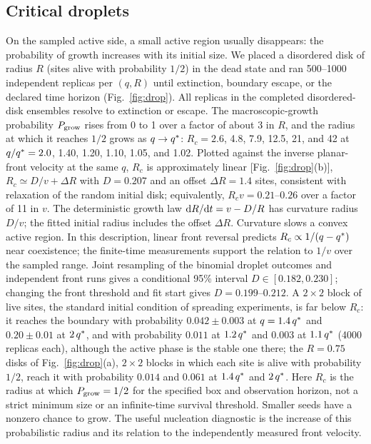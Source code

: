 \subsection{Critical droplets}
\label{sec:drops}

On the sampled active side, a small active region usually disappears:
the probability of growth increases with its initial size. We placed a disordered disk of radius $R$
(sites alive with probability $1/2$) in the dead state and ran 500--1000 independent replicas per
$(q,R)$ until extinction, boundary escape, or the declared time horizon
(Fig.~\ref{fig:drop}). All replicas in the completed disordered-disk ensembles resolve
to extinction or escape. The macroscopic-growth probability $P_{\rm grow}$
rises from 0 to 1 over a factor of about 3 in $R$, and the radius at which it reaches
$1/2$ grows as $q\to q^{*}$: $R_c = 2.6$, 4.8, 7.9, 12.5, 21, and 42 at $q/q^{*} = 2.0$, 1.40,
1.20, 1.10, 1.05, and 1.02. Plotted against the inverse planar-front velocity at the same $q$,
$R_c$ is approximately linear [Fig.~\ref{fig:drop}(b)], $R_c\simeq D/v + \Delta R$ with $D = 0.207$ and an offset
$\Delta R = 1.4$ sites, consistent with relaxation of the random initial disk; equivalently,
$R_c v = 0.21$--$0.26$ over a factor of 11 in $v$. The deterministic growth
law $\mathrm{d} R/\mathrm{d} t = v-D/R$ has curvature radius $D/v$; the fitted initial
radius includes the offset $\Delta R$. Curvature slows a convex active
region. In this
description, linear front reversal predicts $R_c\propto1/(q-q^{*})$ near
coexistence; the finite-time measurements support the relation to $1/v$ over
the sampled range. Joint resampling of the binomial droplet outcomes and
independent front runs gives a conditional 95\% interval $D\in[0.182,0.230]$;
changing the front threshold and fit start gives $D=0.199$--$0.212$.
A $2\times2$ block of live sites, the standard initial
condition of spreading experiments, is far below $R_c$: it reaches the boundary with probability
$0.042\pm0.003$ at $q = 1.4\,q^{*}$ and $0.20\pm0.01$ at $2\,q^{*}$, and with probability $0.011$ at
$1.2\,q^{*}$ and $0.003$ at $1.1\,q^{*}$ (4000 replicas each), although the active phase is the stable
one there; the $R = 0.75$ disks of Fig.~\ref{fig:drop}(a), $2\times2$ blocks in which each site is
alive with probability $1/2$, reach it with probability $0.014$ and $0.061$ at
$1.4\,q^{*}$ and $2\,q^{*}$.
Here $R_c$ is the radius at which $P_{\rm grow}=1/2$ for the specified box
and observation horizon, not a strict minimum size or an infinite-time
survival threshold. Smaller seeds have a nonzero chance to grow. The useful
nucleation diagnostic is the increase of this probabilistic radius and its
relation to the independently measured front velocity.

